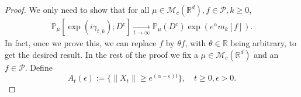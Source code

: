 \documentclass[12pt,a4paper]{amsart}
\theoremstyle{plain}
\theoremstyle{definition}
\numberwithin{equation}{section}
\begin{document}
\begin{proof}
    We only need to show that for all $\mu \in \mathcal M_c(\mathbb R^d), f\in \mathcal P, k \geq 0$, 
\begin{equation}\begin{split}
    \mathbb{P}_{\mu}[\exp(i\gamma_{t,k}); D^c]
    \xrightarrow[t\rightarrow \infty]{}\mathbb{P}_{\mu}(D^c)\exp(e^{\alpha}m_k[f]).
\end{split}\end{equation}
    In fact, once we prove this, we can replace $f$ by $\theta f$, with $\theta \in \mathbb R$ being  arbitrary,  to get the desired result.
    In the rest of the proof we fix a $\mu \in \mathcal M_c(\mathbb R^d)$ and an $f\in \mathcal P$.
    Define
\[
    A_t(\epsilon)
    :=\{ \|X_t\| \geq e^{(\alpha - \epsilon)t} \},
    \quad t\geq 0, \epsilon > 0.
\]


\end{proof}
\end{document}
